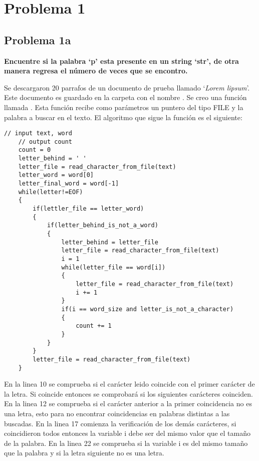 \section*{Problema 1}

\subsection*{Problema 1a}

\textbf{Encuentre si la palabra `p' esta presente en un string `str', de otra manera regresa el número de veces que se encontro.}

Se descargaron 20 parrafos de un documento de prueba llamado `\textit{Lorem lipsum}'\cite{lorem_lipsum}. Este documento es guardado en la carpeta  con el nombre . Se creo una función llamada . Esta función recibe como parámetros un puntero del tipo FILE y la palabra a buscar en el texto. El algoritmo que sigue la función  es el siguiente:

\begin{lstlisting}[style=CStyle]
    // input text, word
    // output count
    count = 0
    letter_behind = ' '
    letter_file = read_character_from_file(text)
    letter_word = word[0]
    letter_final_word = word[-1]
    while(letter!=EOF)
    {
        if(lettler_file == letter_word)
        {
            if(letter_behind_is_not_a_word)
            {
                letter_behind = letter_file
                letter_file = read_character_from_file(text)
                i = 1
                while(letter_file == word[i])
                {
                    letter_file = read_character_from_file(text)
                    i += 1
                }
                if(i == word_size and letter_is_not_a_character)
                {
                    count += 1
                }
            }
        }
        letter_file = read_character_from_file(text)
    }
\end{lstlisting}

En la linea 10 se comprueba si el carácter leido coincide con el primer carácter de la letra. Si coincide entonces se comprobará si los siguientes carácteres coinciden. En la linea 12 se comprueba si el carácter anterior a la primer coincidencia no es una letra, esto para no encontrar coincidencias en palabras distintas a las buscadas. En la linea 17 comienza la verificación de los demás carácteres, si coincidieron todos entonces la variable i debe ser del mismo valor que el tamaño de la palabra. En la linea 22 se comprueba si la variable i es del mismo tamaño que la palabra y si la letra siguiente no es una letra.

